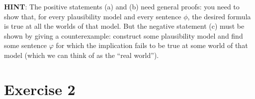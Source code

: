 \documentclass[leqno]{article}
\begin{document}
\textbf{HINT}: The positive statements (a) and (b) need general proofs: you
need to show that, for every plausibility model and every sentence $\phi$, the
desired formula is true at all the worlds of that model. But the negative
statement (c) must be shown by giving a counterexample: construct some
plausibility model and find some sentence $\varphi$ for which the implication
fails to be true at some world of that model (which we can think of as the
“real world”).

\pagebreak
\section*{Exercise 2}



\end{document}
